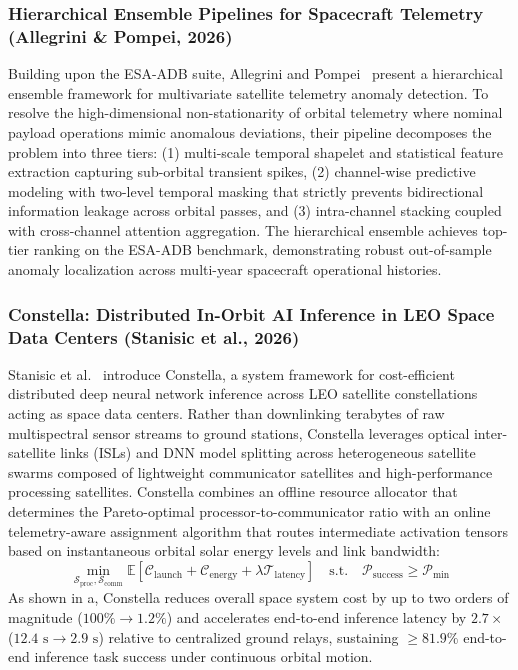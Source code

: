\subsubsection{Hierarchical Ensemble Pipelines for Spacecraft Telemetry (Allegrini \& Pompei, 2026)}
Building upon the ESA-ADB suite, Allegrini and Pompei~\cite{Allegrini2026ESAPipeline} present a hierarchical ensemble framework for multivariate satellite telemetry anomaly detection. To resolve the high-dimensional non-stationarity of orbital telemetry where nominal payload operations mimic anomalous deviations, their pipeline decomposes the problem into three tiers: (1) multi-scale temporal shapelet and statistical feature extraction capturing sub-orbital transient spikes, (2) channel-wise predictive modeling with two-level temporal masking that strictly prevents bidirectional information leakage across orbital passes, and (3) intra-channel stacking coupled with cross-channel attention aggregation. The hierarchical ensemble achieves top-tier ranking on the ESA-ADB benchmark, demonstrating robust out-of-sample anomaly localization across multi-year spacecraft operational histories.

\subsubsection{Constella: Distributed In-Orbit AI Inference in LEO Space Data Centers (Stanisic et al., 2026)}
Stanisic et al.~\cite{Stanisic2026SpaceAI} introduce Constella, a system framework for cost-efficient distributed deep neural network inference across LEO satellite constellations acting as space data centers. Rather than downlinking terabytes of raw multispectral sensor streams to ground stations, Constella leverages optical inter-satellite links (ISLs) and DNN model splitting across heterogeneous satellite swarms composed of lightweight communicator satellites and high-performance processing satellites. Constella combines an offline resource allocator that determines the Pareto-optimal processor-to-communicator ratio with an online telemetry-aware assignment algorithm that routes intermediate activation tensors based on instantaneous orbital solar energy levels and link bandwidth:
\begin{equation}
    \min_{\mathcal{S}_{\text{proc}}, \mathcal{S}_{\text{comm}}} \mathbb{E}\left[ \mathcal{C}_{\text{launch}} + \mathcal{C}_{\text{energy}} + \lambda \mathcal{T}_{\text{latency}} \right] \quad \text{s.t.} \quad \mathcal{P}_{\text{success}} \ge \mathcal{P}_{\text{min}}
\end{equation}
As shown in a, Constella reduces overall space system cost by up to two orders of magnitude ($100\% \to 1.2\%$) and accelerates end-to-end inference latency by $2.7\times$ ($12.4\text{ s} \to 2.9\text{ s}$) relative to centralized ground relays, sustaining $\ge 81.9\%$ end-to-end inference task success under continuous orbital motion.


